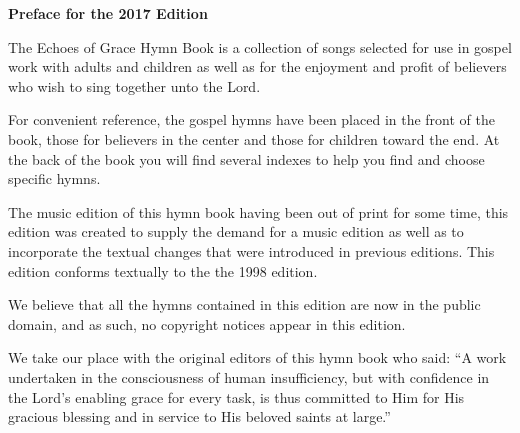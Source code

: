 \documentclass{book}
\begin{document}

\noindent\hfil{\textbf{Preface for the 2017 Edition}}\hfil

The {\textit{}Echoes of Grace Hymn Book} is a collection of songs selected for
use in gospel work with adults and children as well as for the enjoyment and
profit of believers who wish to sing together unto the Lord.

For convenient reference, the gospel hymns have been placed in the front of the
book, those for believers in the center and those for children toward the end.
At the back of the book you will find several indexes to help you find and
choose specific hymns.

The music edition of this hymn book having been out of print for some time,
this edition was created to supply the demand for a music edition as well as to
incorporate the textual changes that were introduced in previous editions. This
edition conforms textually to the the 1998 edition.

We believe that all the hymns contained in this edition are now in the public
domain, and as such, no copyright notices appear in this edition.

We take our place with the original editors of this hymn book who said: ``A
work undertaken in the consciousness of human insufficiency, but with
confidence in the Lord's enabling grace for every task, is thus committed to
Him for His gracious blessing and in service to His beloved saints at large.''
\end{document}
